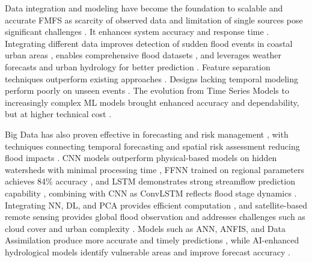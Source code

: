 \documentclass{research}
\begin{document}
Data integration and modeling have become the foundation to scalable and accurate FMFS as scarcity of observed data and limitation of single sources pose significant challenges \cite{song2024stateart,magro2025urban}. It enhances system accuracy and response time \cite{kumar2023state,shen2025new}. Integrating different data improves detection of sudden flood events in coastal urban areas \cite{shampa2025integration}, enables comprehensive flood datasets \cite{dong2022predictive}, and leverages weather forecasts and urban hydrology for better prediction \cite{li2024optimizing,thaisiam2024utilizing}. Feature separation techniques outperform existing approaches \cite{thaisiam2024utilizing}. Designs lacking temporal modeling perform poorly on unseen events \cite{feng2025comparative,gharehbaghi2025developing}. The evolution from Time Series Models to increasingly complex ML models brought enhanced accuracy and dependability, but at higher technical cost \cite{byaruhanga2024evolution}.

Big Data has also proven effective in forecasting and risk management \cite{ziyatbekova2025integrating,kommanaboina2024realtime}, with techniques connecting temporal forecasting and spatial risk assessment reducing flood impacts \cite{roohi2025hybrid}. CNN models outperform physical-based models on hidden watersheds with minimal processing time \cite{gao2024enhancing,guo2022datadriven}, FFNN trained on regional parameters achieves 84\% accuracy \cite{farooq2023ffm}, and LSTM demonstrates strong streamflow prediction capability \cite{kordi2025integrating}, combining with CNN as ConvLSTM reflects flood stage dynamics \cite{priyadharshini2025convlstm}. Integrating NN, DL, and PCA provides efficient computation \cite{guo2020datadriven,mou2025ai,rana2024fusion}, and satellite-based remote sensing provides global flood observation and addresses challenges such as cloud cover and urban complexity \cite{aravamudan2025superresolution,fawakherji2025flood,schumann2023flood}. Models such as ANN, ANFIS, and Data Assimilation produce more accurate and timely predictions \cite{seydi2022fusion,annis2021gfplain}, while AI-enhanced hydrological models identify vulnerable areas and improve forecast accuracy \cite{ougahi2025enhanced,yang2024advancing}.
\end{document}
